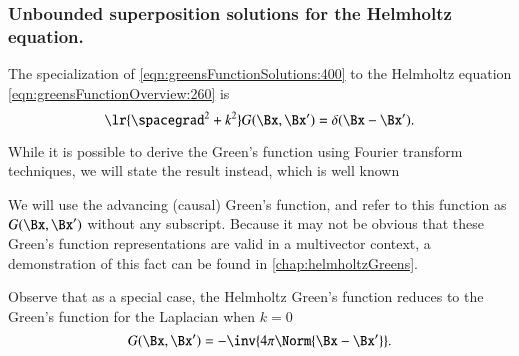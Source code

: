 %
%
\subsubsection{Unbounded superposition solutions for the Helmholtz equation.}

The specialization of \cref{eqn:greensFunctionSolutions:400} to the Helmholtz equation \cref{eqn:greensFunctionOverview:260} is
\begin{dmath}\label{eqn:greensFunctionHelmholtz:420}
\lr{ \spacegrad^2 + k^2 } G(\Bx, \Bx') = \delta(\Bx - \Bx').
\end{dmath}

While it is possible \citep{schwinger1998classical} to derive the Green's function using Fourier transform techniques, we will state the result instead, which is well known


We will use the advancing (causal) Green's function, and refer to this function as \( G(\Bx, \Bx') \) without any subscript.
Because it may not be obvious that these
Green's function representations are valid in a multivector context, a demonstration of this fact can be found in \cref{chap:helmholtzGreens}.

Observe that as a special case, the Helmholtz Green's function reduces to the Green's function for the Laplacian when \( k = 0 \)
\begin{dmath}\label{eqn:greensFunctionHelmholtz:80}
G(\Bx, \Bx') = -\inv{ 4 \pi \Norm{\Bx - \Bx'}}.
\end{dmath}

